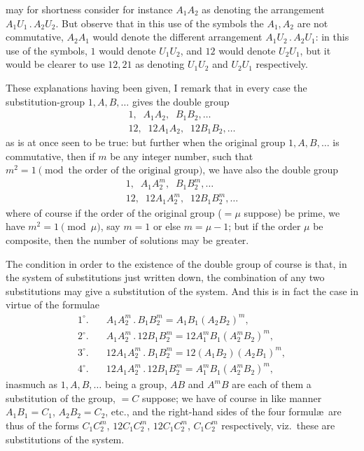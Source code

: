 \documentclass[11pt,a4paper]{article}
\begin{document}

may for shortness consider for instance $A_{1}A_{2}$ as denoting the arrangement $A_{1}U_{1}\,.\,A_{2}U_{2}$. But observe that in this use of the symbols the $A_{1}, A_{2}$ are not commutative, $A_{2}A_{1}$ would denote the different arrangement $A_{1}U_{2}\,.\,A_{2}U_{1}$: in this use of the symbols, $1$ would denote $U_{1}U_{2}$, and $12$ would denote $U_{2}U_{1}$, but it would be clearer to use $12, 21$ as denoting $U_{1}U_{2}$ and $U_{2}U_{1}$ respectively.

These explanations having been given, I remark that in every case the substitution-group $1, A, B, \ldots$ gives the double group
\[
\begin{array}{l}
1, \;\; A_{1}A_{2}, \;\; B_{1}B_{2}, \ldots\\[3pt]
12, \;\; 12A_{1}A_{2}, \;\; 12B_{1}B_{2}, \ldots
\end{array}
\]
as is at once seen to be true: but further when the original group $1, A, B, \ldots$ is commutative, then if $m$ be any integer number, such that $m^{2} = 1 \pmod{\text{the order of the original group}}$, we have also the double group
\[
\begin{array}{l}
1, \;\; A_{1}A_{2}^{m}, \;\; B_{1}B_{2}^{m}, \ldots\\[3pt]
12, \;\; 12A_{1}A_{2}^{m}, \;\; 12B_{1}B_{2}^{m}, \ldots
\end{array}
\]
where of course if the order of the original group ($= \mu$ suppose) be prime, we have $m^{2} = 1 \pmod{\mu}$, say $m = 1$ or else $m = \mu - 1$; but if the order $\mu$ be composite, then the number of solutions may be greater.

The condition in order to the existence of the double group of course is that, in the system of substitutions just written down, the combination of any two substitutions may give a substitution of the system. And this is in fact the case in virtue of the formulae
\[
\begin{aligned}
1^{\circ}.\quad & A_{1}A_{2}^{m}\,.\,B_{1}B_{2}^{m} = A_{1}B_{1}(A_{2}B_{2})^{m},\\
2^{\circ}.\quad & A_{1}A_{2}^{m}\,.\,12B_{1}B_{2}^{m} = 12A_{1}^{m}B_{1}(A_{2}^{m}B_{2})^{m},\\
3^{\circ}.\quad & 12A_{1}A_{2}^{m}\,.\,B_{1}B_{2}^{m} = 12(A_{1}B_{2})(A_{2}B_{1})^{m},\\
4^{\circ}.\quad & 12A_{1}A_{2}^{m}\,.\,12B_{1}B_{2}^{m} = A_{1}^{m}B_{1}(A_{2}^{m}B_{2})^{m},
\end{aligned}
\]
inasmuch as $1, A, B, \ldots$ being a group, $AB$ and $A^{m}B$ are each of them a substitution of the group, $= C$ suppose; we have of course in like manner $A_{1}B_{1} = C_{1}$, $A_{2}B_{2} = C_{2}$, etc., and the right-hand sides of the four formul\ae\ are thus of the forms $C_{1}C_{2}^{m}$, $12C_{1}C_{2}^{m}$, $12C_{1}C_{2}^{m}$, $C_{1}C_{2}^{m}$ respectively, viz.\ these are substitutions of the system.
\end{document}
